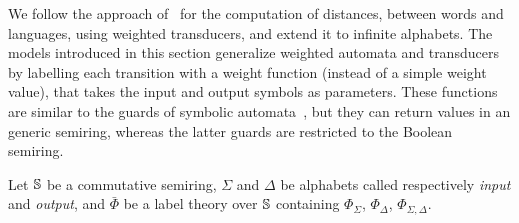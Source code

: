 We follow the approach of~\cite{Mohri03EDWA} for the computation of distances,
between words and languages, using weighted transducers, 
and extend it to infinite alphabets.
%
The models introduced in this section generalize 
weighted automata and transducers~\cite{Droste09handbook} 
by labelling each transition with a weight function (instead of a simple weight value), 
that takes the input and output symbols as parameters. 
These functions are similar to the guards of symbolic automata~\cite{dAntoniVeanes17CAV,dAntoni21CACM},
but they can return values in an generic semiring, 
whereas the latter guards are restricted to the Boolean semiring.
%

\noindent 
Let $\mathbb{S}$ be a commutative semiring, 
$\Sigma$ and $\Delta$ be alphabets called respectively \emph{input} and \emph{output}, %
and $\bar\Phi$ be a label theory over $\mathbb{S}$
containing $\Phi_\Sigma$, $\Phi_\Delta$, $\Phi_{\Sigma, \Delta}$.


